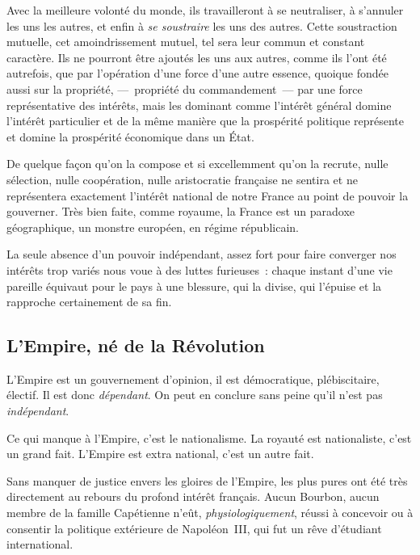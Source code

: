 \documentclass[french,twoside]{book} %
\newcommand{\astermono}{\medskip\centerline{\color{rubric}\large\selectfont{\syms ✻}}\medskip\par}%
\begin{document}
\astermono

\noindent Avec la meilleure volonté du monde, ils travailleront à se neutraliser, à s’annuler les uns les autres, et enfin à \emph{se soustraire} les uns des autres. Cette soustraction mutuelle, cet amoindrissement mutuel, tel sera leur commun et constant caractère. Ils ne pourront être ajoutés les uns aux autres, comme ils l’ont été autrefois, que par l’opération d’une force d’une autre essence, quoique fondée aussi sur la propriété, — propriété du commandement — par une force représentative des intérêts, mais les dominant comme l’intérêt général domine l’intérêt particulier et de la même manière que la prospérité politique représente et domine la prospérité économique dans un État.\par
De quelque façon qu’on la compose et si excellemment qu’on la recrute, nulle sélection, nulle coopération, nulle aristocratie française ne sentira et ne représentera exactement l’intérêt national de notre France au point de pouvoir la gouverner. Très bien faite, comme royaume, la France est un paradoxe géographique, un monstre européen, en régime républicain.\par
La seule absence d’un pouvoir indépendant, assez fort pour faire converger nos intérêts trop variés nous voue à des luttes furieuses : chaque instant d’une vie pareille équivaut pour le pays à une blessure, qui la divise, qui l’épuise et la rapproche certainement de sa fin.\par

\astermono

\subsection[L’Empire, né de la Révolution]{L’Empire, né de la Révolution}
\noindent L’Empire est un gouvernement d’opinion, il est démocratique, plébiscitaire, électif. Il est donc \emph{dépendant}. On peut en conclure sans peine qu’il n’est pas \emph{indépendant}.\par

\astermono

\noindent Ce qui manque à l’Empire, c’est le nationalisme. La royauté est nationaliste, c’est un grand fait. L’Empire est extra national, c’est un autre fait.\par

\astermono

\noindent Sans manquer de justice envers les gloires de l’Empire, les plus pures ont été très directement au rebours du profond intérêt français. Aucun Bourbon, aucun membre de la famille Capétienne n’eût, \emph{physiologiquement}, réussi à concevoir ou à consentir la politique extérieure de Napoléon III, qui fut un rêve d’étudiant international.\par
\end{document}
